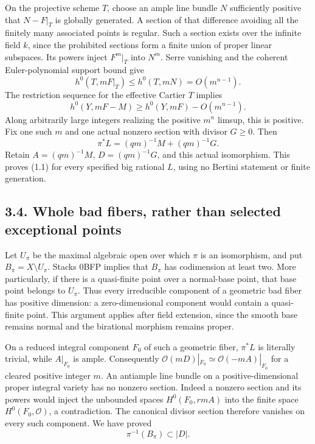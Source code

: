 \documentclass[
  10pt,
]{article}
\begin{document}
On the projective scheme \(T\), choose an ample line bundle \(N\)
sufficiently positive that \(N-F|_T\) is globally generated. A section
of that difference avoiding all the finitely many associated points is
regular. Such a section exists over the infinite field \(k\), since the
prohibited sections form a finite union of proper linear subspaces. Its
powers inject \(F^m|_T\) into \(N^m\). Serre vanishing and the coherent
Euler-polynomial support bound give
\[h^0(T,mF|_T)\leq h^0(T,mN)=O(m^{n-1}).\] The restriction sequence for
the effective Cartier \(T\) implies
\[h^0(Y,mF-M)\geq h^0(Y,mF)-O(m^{n-1}).\] Along arbitrarily large
integers realizing the positive \(m^n\) limsup, this is positive. Fix
one such \(m\) and one actual nonzero section with divisor \(G\geq0\).
Then \[\pi^*L=(qm)^{-1}M+(qm)^{-1}G.\] Retain \(A=(qm)^{-1}M\),
\(D=(qm)^{-1}G\), and this actual isomorphism. This proves (1.1) for
every specified big rational \(L\), using no Bertini statement or finite
generation.

\subsection{3.4. Whole bad fibers, rather than selected exceptional
points}\label{whole-bad-fibers-rather-than-selected-exceptional-points}

Let \(U_\pi\) be the maximal algebraic open over which \(\pi\) is an
isomorphism, and put \(B_\pi=X\setminus U_\pi\). Stacks 0BFP implies
that \(B_\pi\) has codimension at least two. More particularly, if there
is a quasi-finite point over a normal-base point, that base point
belongs to \(U_\pi\). Thus every irreducible component of a geometric
bad fiber has positive dimension: a zero-dimensional component would
contain a quasi-finite point. This argument applies after field
extension, since the smooth base remains normal and the birational
morphism remains proper.

On a reduced integral component \(F_0\) of such a geometric fiber,
\(\pi^*L\) is literally trivial, while \(A|_{F_0}\) is ample.
Consequently \(\mathcal O(mD)|_{F_0}\simeq\mathcal O(-mA)|_{F_0}\) for a
cleared positive integer \(m\). An antiample line bundle on a
positive-dimensional proper integral variety has no nonzero section.
Indeed a nonzero section and its powers would inject the unbounded
spaces \(H^0(F_0,rmA)\) into the finite space \(H^0(F_0,\mathcal O)\), a
contradiction. The canonical divisor section therefore vanishes on every
such component. We have proved \[\pi^{-1}(B_\pi)\subset |D|.\]
\end{document}
